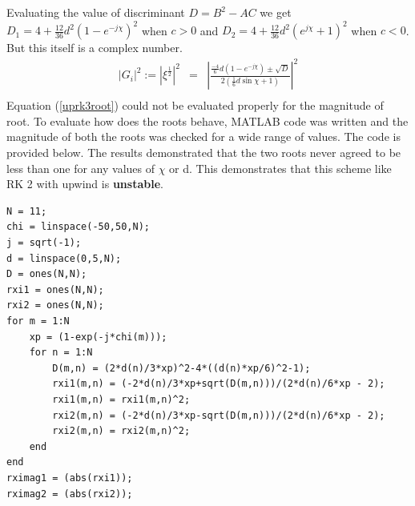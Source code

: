 \documentclass[a4paper,12pt]{report}
\begin{document}
Evaluating the value of discriminant $D = B^2 - AC$ we get $D_1 = 4 + \frac{12}{36}d^2(1-e^{-j\chi})^2$ when $c>0$
and $D_2 = 4 + \frac{12}{36}d^2(e^{j\chi}+1)^2$ when $c<0$.
But this itself is a complex number. 
 \begin{eqnarray}
|G_i|^2 := |\xi^\frac{1}{2}|^2 &=& |\frac{\frac{-4}{6}d(1-e^{-j\chi})\pm \sqrt{D}}{2(\frac{1}{6}d\sin{\chi}+1)}|^2 \label{uprk3root}\\
\end{eqnarray}
Equation (\ref{uprk3root}) could not be evaluated properly for the magnitude of root. To evaluate how does the roots behave, MATLAB code was written and the magnitude of both the roots was checked for a wide range of values. The code is provided below. The results demonstrated that the two roots never agreed to be less than one for any values of $\chi$ or d. This demonstrates that this scheme like RK 2 with upwind is \textbf{unstable}.
\begin{lstlisting}
N = 11;
chi = linspace(-50,50,N);
j = sqrt(-1);
d = linspace(0,5,N);
D = ones(N,N);
rxi1 = ones(N,N);
rxi2 = ones(N,N);
for m = 1:N
    xp = (1-exp(-j*chi(m)));
    for n = 1:N       
        D(m,n) = (2*d(n)/3*xp)^2-4*((d(n)*xp/6)^2-1);
        rxi1(m,n) = (-2*d(n)/3*xp+sqrt(D(m,n)))/(2*d(n)/6*xp - 2);
        rxi1(m,n) = rxi1(m,n)^2;
        rxi2(m,n) = (-2*d(n)/3*xp-sqrt(D(m,n)))/(2*d(n)/6*xp - 2);
        rxi2(m,n) = rxi2(m,n)^2;
    end
end
rximag1 = (abs(rxi1));
rximag2 = (abs(rxi2));
\end{lstlisting}
\end{document}
